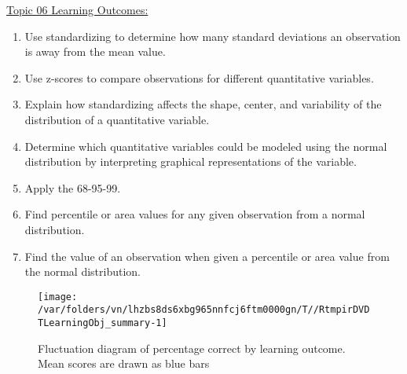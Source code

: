 \documentclass[12pt,english,nohyper]{tufte-handout}\usepackage[]{graphicx}\usepackage[]{color}
\newenvironment{knitrout}{}{} %
\begin{document}
\noindent
\underline{Topic 06 Learning Outcomes:}
\vspace{2mm}

\begin{fullwidth}
\begin{enumerate}[label=\Alph*.,itemsep=-\parsep,leftmargin=*]
  \item
Use standardizing to determine how many standard deviations an observation is away from the mean value.
\item Use z-scores to compare observations for different quantitative variables.
\item Explain how standardizing affects the shape, center, and variability of the distribution of a quantitative variable.
\item Determine which quantitative variables could be modeled using the normal distribution by interpreting graphical representations of the variable.
\item Apply the 68-95-99.
\item Find percentile or area values for any given observation from a normal distribution.
\item Find the value of an observation when given a percentile or area value from the normal distribution.

\end{enumerate}
\end{fullwidth}

\begin{knitrout}
\color{fgcolor}\begin{figure}
\texttt{[image: /var/folders/vn/lhzbs8ds6xbg965nnfcj6ftm0000gn/T//RtmpirDVDTLearningObj\_summary-1]} \caption[Fluctuation diagram of percentage correct by learning outcome]{Fluctuation diagram of percentage correct by learning outcome. Mean scores are drawn as blue bars}\label{fig:LearningObj_summary}
\end{figure}


\end{knitrout}

\vspace{5mm}
\end{document}
